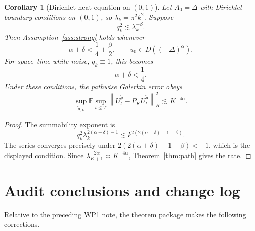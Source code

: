 \documentclass[11pt]{article}
\newtheorem{corollary}[assumption]{Corollary}
\theoremstyle{remark}
\newcommand{\E}{\mathbb E}
\newcommand{\1}{\mathbf 1}
\newcommand{\hnorm}[1]{\left\lVert #1\right\rVert_H}
\begin{document}
\begin{corollary}[Dirichlet heat equation on \((0,1)\)]\label{cor:heat}
Let \(A_0=\Delta\) with Dirichlet boundary conditions on \((0,1)\), so \(\lambda_k=\pi^2k^2\).  Suppose
\[
 q_k^2\lesssim\lambda_k^{-\beta}.
\]
Then Assumption~\ref{ass:strong} holds whenever
\[
 \alpha+\delta<\frac14+\frac\beta2,
 \qquad
 u_0\in D((-\Delta)^\alpha).
\]
For space--time white noise, \(q_k\equiv1\), this becomes
\[
 \alpha+\delta<\frac14.
\]
Under these conditions, the pathwise Galerkin error obeys
\[
 \sup_{\widetilde\theta,\sigma}
 \E\sup_{t\le T}
 \hnorm{U_t^{\widetilde\theta}-P_KU_t^{\widetilde\theta}}^2
 \lesssim K^{-4\alpha}.
\]
\end{corollary}

\begin{proof}
The summability exponent is
\[
 q_k^2\lambda_k^{2(\alpha+\delta)-1}
 \lesssim
 k^{2(2(\alpha+\delta)-1-\beta)}.
\]
The series converges precisely under
\(2(2(\alpha+\delta)-1-\beta)<-1\), which is the displayed condition.  Since \(\lambda_{K+1}^{-2\alpha}\asymp K^{-4\alpha}\), Theorem~\ref{thm:path} gives the rate.
\end{proof}

\section{Audit conclusions and change log}

Relative to the preceding WP1 note, the theorem package makes the following corrections.
\end{document}
